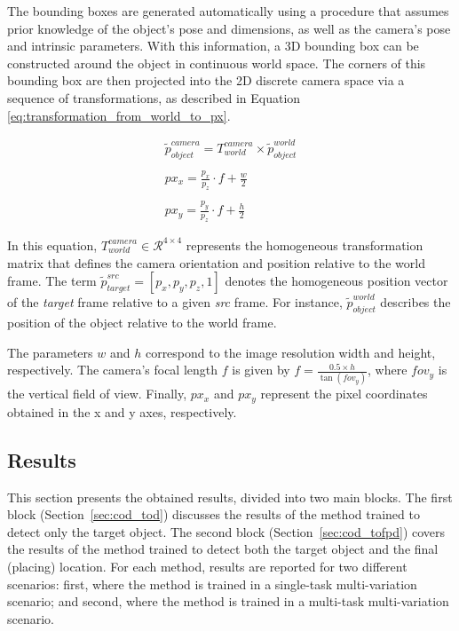 The bounding boxes are generated automatically using a procedure that assumes prior knowledge of the object's pose and dimensions, as well as the camera's pose and intrinsic parameters. With this information, a 3D bounding box can be constructed around the object in continuous world space. The corners of this bounding box are then projected into the 2D discrete camera space via a sequence of transformations, as described in Equation \ref{eq:transformation_from_world_to_px}.

\begin{equation}
    \label{eq:transformation_from_world_to_px}
    \begin{matrix}
        \tilde{p}^{camera}_{object} = T^{camera}_{world} \times \tilde{p}^{world}_{object}
        \\ \\
        px_x =  \frac{p_x}{p_z} \cdot f + \frac{w}{2} 
        \\ \\
        px_y =  \frac{p_y}{p_z} \cdot f + \frac{h}{2}
    \end{matrix}
\end{equation}

In this equation, $T^{camera}_{world} \in \mathcal{R}^{4 \times 4}$ represents the homogeneous transformation matrix that defines the camera orientation and position relative to the world frame. The term $\tilde{p}^{src}_{target} = \left[ p_x, p_y, p_z, 1 \right]$ denotes the homogeneous position vector of the \textit{target} frame relative to a given \textit{src} frame. For instance, $\tilde{p}^{world}_{object}$ describes the position of the object relative to the world frame. 

The parameters $w$ and $h$ correspond to the image resolution width and height, respectively. The camera's focal length $f$ is given by $f = \frac{0.5 \times h}{\tan(fov_y)}$, where $fov_y$ is the vertical field of view. Finally, $px_x$ and $px_y$ represent the pixel coordinates obtained in the x and y axes, respectively.

\subsection{Results}
\label{sec:cod_results}
This section presents the obtained results, divided into two main blocks. The first block (Section~\ref{sec:cod_tod}) discusses the results of the method trained to detect only the target object. The second block (Section~\ref{sec:cod_tofpd}) covers the results of the method trained to detect both the target object and the final (placing) location. For each method, results are reported for two different scenarios: first, where the method is trained in a single-task multi-variation scenario; and second, where the method is trained in a multi-task multi-variation scenario.

